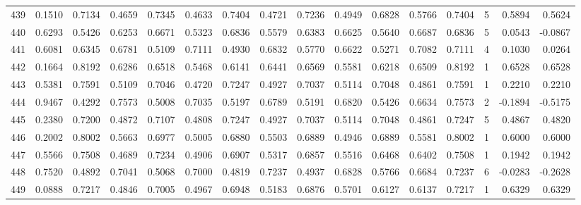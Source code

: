 \begin{tabular}{lrrrrrrrrrrrrrrr}
439 &      0.1510 &  0.7134 &  0.4659 &  0.7345 &  0.4633 &  0.7404 &  0.4721 &  0.7236 &  0.4949 &  0.6828 &   0.5766 &     0.7404 &      5 &                    0.5894 &                     0.5624 \\
440 &      0.6293 &  0.5426 &  0.6253 &  0.6671 &  0.5323 &  0.6836 &  0.5579 &  0.6383 &  0.6625 &  0.5640 &   0.6687 &     0.6836 &      5 &                    0.0543 &                    -0.0867 \\
441 &      0.6081 &  0.6345 &  0.6781 &  0.5109 &  0.7111 &  0.4930 &  0.6832 &  0.5770 &  0.6622 &  0.5271 &   0.7082 &     0.7111 &      4 &                    0.1030 &                     0.0264 \\
442 &      0.1664 &  0.8192 &  0.6286 &  0.6518 &  0.5468 &  0.6141 &  0.6441 &  0.6569 &  0.5581 &  0.6218 &   0.6509 &     0.8192 &      1 &                    0.6528 &                     0.6528 \\
443 &      0.5381 &  0.7591 &  0.5109 &  0.7046 &  0.4720 &  0.7247 &  0.4927 &  0.7037 &  0.5114 &  0.7048 &   0.4861 &     0.7591 &      1 &                    0.2210 &                     0.2210 \\
444 &      0.9467 &  0.4292 &  0.7573 &  0.5008 &  0.7035 &  0.5197 &  0.6789 &  0.5191 &  0.6820 &  0.5426 &   0.6634 &     0.7573 &      2 &                   -0.1894 &                    -0.5175 \\
445 &      0.2380 &  0.7200 &  0.4872 &  0.7107 &  0.4808 &  0.7247 &  0.4927 &  0.7037 &  0.5114 &  0.7048 &   0.4861 &     0.7247 &      5 &                    0.4867 &                     0.4820 \\
446 &      0.2002 &  0.8002 &  0.5663 &  0.6977 &  0.5005 &  0.6880 &  0.5503 &  0.6889 &  0.4946 &  0.6889 &   0.5581 &     0.8002 &      1 &                    0.6000 &                     0.6000 \\
447 &      0.5566 &  0.7508 &  0.4689 &  0.7234 &  0.4906 &  0.6907 &  0.5317 &  0.6857 &  0.5516 &  0.6468 &   0.6402 &     0.7508 &      1 &                    0.1942 &                     0.1942 \\
448 &      0.7520 &  0.4892 &  0.7041 &  0.5068 &  0.7000 &  0.4819 &  0.7237 &  0.4937 &  0.6828 &  0.5766 &   0.6684 &     0.7237 &      6 &                   -0.0283 &                    -0.2628 \\
449 &      0.0888 &  0.7217 &  0.4846 &  0.7005 &  0.4967 &  0.6948 &  0.5183 &  0.6876 &  0.5701 &  0.6127 &   0.6137 &     0.7217 &      1 &                    0.6329 &                     0.6329 \\

\end{tabular}
